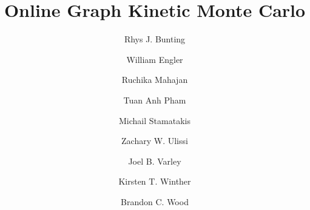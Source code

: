\documentclass[a4paper, amsfonts, amssymb, amsmath, reprint, showkeys, footinbib, twoside,superscriptaddress,floatfix,longbibliography]{revtex4-2}
\begin{document}

\title{Online Graph Kinetic Monte Carlo}
\author{Rhys J. Bunting}%
\author{William Engler}
\author{Ruchika Mahajan}
\author{Tuan Anh Pham}%
\author{Michail Stamatakis}
\author{Zachary W. Ulissi}
\author{Joel B. Varley}
\author{Kirsten T. Winther}
\author{Brandon C. Wood}

\maketitle



\end{document}

